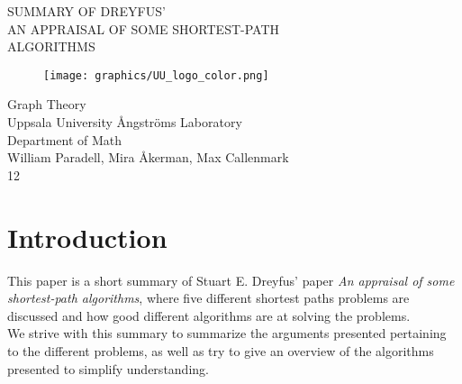 \documentclass{article}
\begin{document}
\thispagestyle{empty}

\vspace*{+2em}
\begin{center}
    {\LARGE SUMMARY OF DREYFUS' \\
    AN APPRAISAL OF SOME SHORTEST-PATH \\
    ALGORITHMS\\}
\vspace*{+4em}


\vspace*{+3em}
\begin{figure}[h]
    \centering
    \texttt{[image: graphics/UU\_logo\_color.png]}
\end{figure}

\vspace*{+3em}
Graph Theory \\
Uppsala University Ångströms Laboratory\\
Department of Math\\
\vspace*{+2em}
William Paradell, Mira Åkerman, Max Callenmark\\

\vspace*{+10em}
12

\end{center}

\newpage

\section{Introduction}

This paper is a short summary of Stuart E. Dreyfus' paper 
\textit{An appraisal of some shortest-path algorithms}, where five 
different shortest paths problems are discussed and how good 
different algorithms are at solving the problems.  \\
\indent We strive with this summary to summarize the arguments presented
pertaining to the different problems, as well as try to give an 
overview of the algorithms presented to simplify understanding. 
\end{document}
